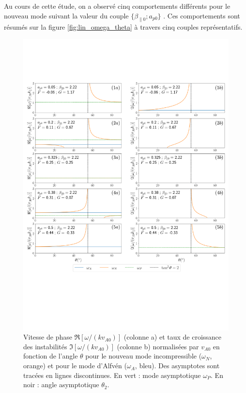  Au cours de cette étude, on a observé cinq comportements différents pour le nouveau mode suivant la valeur du couple  $\{\beta_{\parallel 0};a_{p0}\}$ . Ces comportements sont résumés sur la figure \ref{fig:lin_omega_theta} à travers cinq couples représentatifs. 
\begin{figure}[!ht]
 \centering
\includegraphics[width=\linewidth,trim=0.5cm 6cm 0cm 3cm, clip=true]{./Mainmatter/Part_2/images/lin_omega_theta}
\cprotect\caption{Vitesse de phase \ensuremath{\Re[\omega/(kv_{A0})]} (colonne a) et taux de croissance des instabilités \ensuremath{\Im[\omega/(kv_{A0})]} (colonne b) normalisées par \ensuremath{v_{A0}} en fonction de l'angle \ensuremath{\theta} pour le nouveau mode incompressible (\ensuremath{\omega_N}, orange) et pour le mode d'Alfvén (\ensuremath{\omega_A}, bleu). Des asymptotes sont tracées en lignes discontinues. En vert : mode asymptotique \ensuremath{\omega_P}. En noir : angle asymptotique \ensuremath{\theta_2}. 
}
\end{figure}
